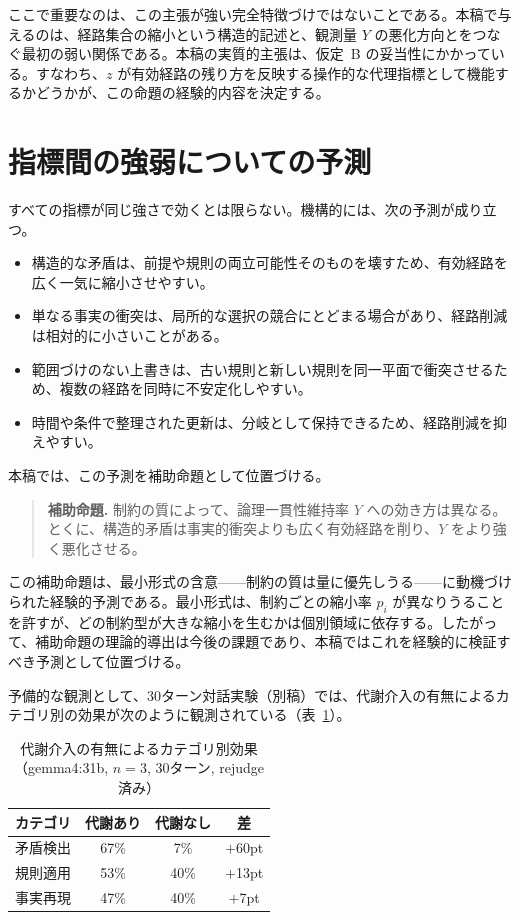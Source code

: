 \documentclass[12pt,a4paper]{article}
\begin{document}
ここで重要なのは、この主張が強い完全特徴づけではないことである。本稿で与えるのは、経路集合の縮小という構造的記述と、観測量 $Y$ の悪化方向とをつなぐ最初の弱い関係である。本稿の実質的主張は、仮定~B の妥当性にかかっている。すなわち、$z$ が有効経路の残り方を反映する操作的な代理指標として機能するかどうかが、この命題の経験的内容を決定する。

\section{指標間の強弱についての予測}\label{sec:auxiliary}

すべての指標が同じ強さで効くとは限らない。機構的には、次の予測が成り立つ。

\begin{itemize}
  \item 構造的な矛盾は、前提や規則の両立可能性そのものを壊すため、有効経路を広く一気に縮小させやすい。
  \item 単なる事実の衝突は、局所的な選択の競合にとどまる場合があり、経路削減は相対的に小さいことがある。
  \item 範囲づけのない上書きは、古い規則と新しい規則を同一平面で衝突させるため、複数の経路を同時に不安定化しやすい。
  \item 時間や条件で整理された更新は、分岐として保持できるため、経路削減を抑えやすい。
\end{itemize}

本稿では、この予測を補助命題として位置づける。

\begin{quote}
\textbf{補助命題.}
制約の質によって、論理一貫性維持率 $Y$ への効き方は異なる。とくに、構造的矛盾は事実的衝突よりも広く有効経路を削り、$Y$ をより強く悪化させる。
\end{quote}

この補助命題は、最小形式の含意——制約の質は量に優先しうる——に動機づけられた経験的予測である。最小形式は、制約ごとの縮小率 $p_i$ が異なりうることを許すが、どの制約型が大きな縮小を生むかは個別領域に依存する。したがって、補助命題の理論的導出は今後の課題であり、本稿ではこれを経験的に検証すべき予測として位置づける。

予備的な観測として、30ターン対話実験（別稿）では、代謝介入の有無によるカテゴリ別の効果が次のように観測されている（表~\ref{tab:gemma4}）。

\begin{table}[htbp]
\centering
\caption{代謝介入の有無によるカテゴリ別効果（gemma4:31b, $n=3$, 30ターン, rejudge 済み）}\label{tab:gemma4}
\begin{tabular}{lccc}
\toprule
カテゴリ & 代謝あり & 代謝なし & 差 \\
\midrule
矛盾検出     & 67\% & 7\%  & $+$60pt \\
規則適用     & 53\% & 40\% & $+$13pt \\
事実再現     & 47\% & 40\% & $+$7pt \\
\bottomrule
\end{tabular}
\end{table}
\end{document}
